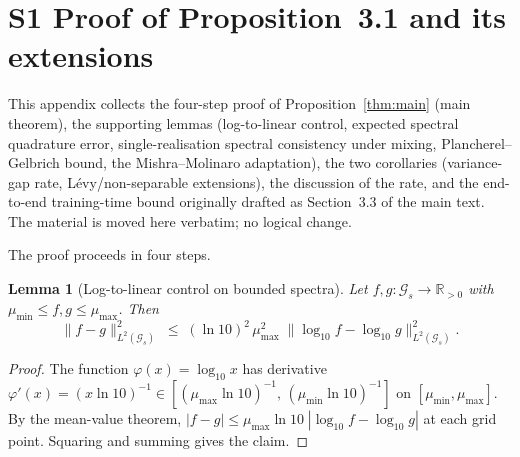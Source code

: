 \documentclass[review,12pt]{elsarticle}
\newtheorem{lemma}{Lemma}
\begin{document}
\appendix

\section*{S1 \quad Proof of Proposition~3.1 and its extensions}
\label{app:convergence-proofs}

This appendix collects the four-step proof of
Proposition~\ref{thm:main} (main theorem), the supporting
lemmas (log-to-linear control, expected spectral quadrature error,
single-realisation spectral consistency under mixing,
Plancherel--Gelbrich bound, the Mishra--Molinaro adaptation), the
two corollaries (variance-gap rate, L\'evy/non-separable extensions),
the discussion of the rate, and the end-to-end training-time bound
originally drafted as Section~3.3 of the main text. The material is
moved here verbatim; no logical change.

The proof proceeds in four steps.

\begin{lemma}[Log-to-linear control on bounded spectra]
\label{lem:log-linear}
Let \(f, g : \mathcal G_s \to \mathbb R_{>0}\) with
\(\mu_{\min} \le f, g \le \mu_{\max}\). Then
\[
\|f - g\|^2_{L^2(\mathcal G_s)}
\;\le\; (\ln 10)^2\,\mu_{\max}^2\;
\|\log_{10} f - \log_{10} g\|^2_{L^2(\mathcal G_s)}.
\]
\end{lemma}
\begin{proof}
The function \(\varphi(x) = \log_{10} x\) has derivative
\(\varphi'(x) = (x \ln 10)^{-1}
\in [(\mu_{\max}\ln 10)^{-1},\, (\mu_{\min}\ln 10)^{-1}]\)
on \([\mu_{\min}, \mu_{\max}]\). By the mean-value theorem,
\(|f - g| \le \mu_{\max}\ln 10\;|\log_{10} f - \log_{10} g|\)
at each grid point. Squaring and summing gives the claim.
\end{proof}
\end{document}
